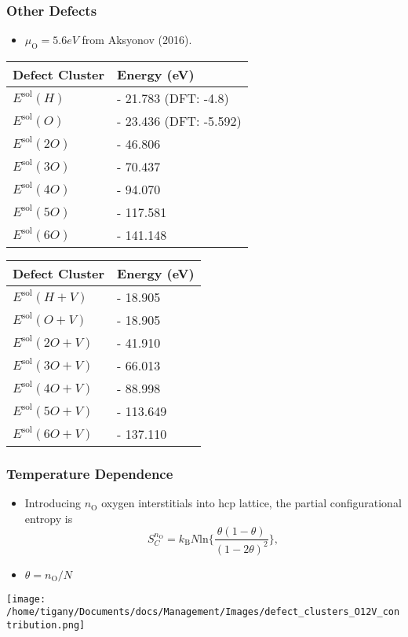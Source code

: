 \documentclass[11pt]{article}
\begin{document}
\subsubsection*{Other Defects}
\label{sec:orgd310edc}
\begin{itemize}
\item \(\mu_{\text{O}} = 5.6 eV\) from Aksyonov (2016).
\end{itemize}


\begin{center}
\begin{tabular}{ll}
Defect Cluster & Energy (eV)\\
\hline
\(E^{\text{sol}}(H)\) & -  21.783 (DFT: -4.8)\\
\(E^{\text{sol}}(O)\) & -  23.436 (DFT: -5.592)\\
\(E^{\text{sol}}(2O)\) & -  46.806\\
\(E^{\text{sol}}(3O)\) & -  70.437\\
\(E^{\text{sol}}(4O)\) & -  94.070\\
\(E^{\text{sol}}(5O)\) & - 117.581\\
\(E^{\text{sol}}(6O)\) & - 141.148\\
\end{tabular}
\end{center}

\begin{center}
\begin{tabular}{ll}
Defect Cluster & Energy (eV)\\
\hline
\(E^{\text{sol}}(H+V)\) & -  18.905\\
\(E^{\text{sol}}(O+V)\) & -  18.905\\
\(E^{\text{sol}}(2O+V)\) & -  41.910\\
\(E^{\text{sol}}(3O+V)\) & -  66.013\\
\(E^{\text{sol}}(4O+V)\) & -  88.998\\
\(E^{\text{sol}}(5O+V)\) & - 113.649\\
\(E^{\text{sol}}(6O+V)\) & - 137.110\\
\end{tabular}
\end{center}




\subsubsection*{Temperature Dependence}
\label{sec:org921fe98}

\begin{itemize}
\item Introducing \(n_{\text{O}}\) oxygen interstitials into hcp lattice, the
partial configurational entropy is \[ S_{C}^{n_\text{O}} =
      k_{\text{B}}N\text{ln}\Big\{ \frac{\theta(1-\theta)}{(1-2\theta)^2} \Big\}, \]
\item \(\theta = n_{\text{O}}/N\)
\end{itemize}
\begin{center}
\texttt{[image: /home/tigany/Documents/docs/Management/Images/defect\_clusters\_O12V\_contribution.png]}
\end{center}
\end{document}
